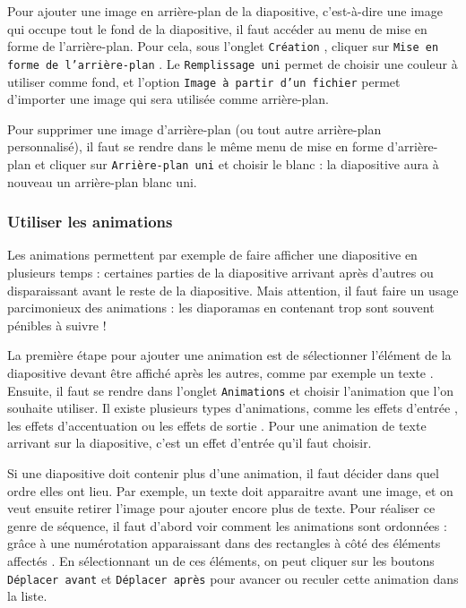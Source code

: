 Pour ajouter une image en arrière-plan de la diapositive, c'est-à-dire une image qui occupe tout le fond de la diapositive, il faut accéder au menu de mise en forme de l'arrière-plan. Pour cela, sous l'onglet \texttt{Création} , cliquer sur \texttt{Mise en forme de l'arrière-plan} . Le \texttt{Remplissage uni}  permet de choisir une couleur à utiliser comme fond, et l'option \texttt{Image à partir d'un fichier}  permet d'importer une image qui sera utilisée comme arrière-plan.



Pour supprimer une image d'arrière-plan (ou tout autre arrière-plan personnalisé), il faut se rendre dans le même menu de mise en forme d'arrière-plan et cliquer sur \texttt{Arrière-plan uni} et choisir le blanc : la diapositive aura à nouveau un arrière-plan blanc uni. 



\subsubsection{Utiliser les animations}\label{Presentation1effets}

Les animations permettent par exemple de faire afficher une diapositive en plusieurs temps : certaines parties de la diapositive arrivant après d'autres ou disparaissant avant le reste de la diapositive. Mais attention, il faut faire un usage parcimonieux des animations : les diaporamas en contenant trop sont souvent pénibles à suivre !

La première étape pour ajouter une animation est de sélectionner l'élément de la diapositive devant être affiché après les autres, comme par exemple un texte . Ensuite, il faut se rendre dans l'onglet \texttt{Animations}  et choisir l'animation que l'on souhaite utiliser. Il existe plusieurs types d'animations, comme les effets d'entrée , les effets d'accentuation  ou les effets de sortie . Pour une animation de texte arrivant sur la diapositive, c'est un effet d'entrée qu'il faut choisir.


Si une diapositive doit contenir plus d'une animation, il faut décider dans quel ordre elles ont lieu. Par exemple, un texte doit apparaitre avant une image, et on veut ensuite retirer l'image pour ajouter encore plus de texte. Pour réaliser ce genre de séquence, il faut d'abord voir comment les animations sont ordonnées : grâce à une numérotation apparaissant dans des rectangles à côté des éléments affectés . En sélectionnant un de ces éléments, on peut cliquer sur les boutons \texttt{Déplacer avant} et \texttt{Déplacer après}  pour avancer ou reculer cette animation dans la liste.

